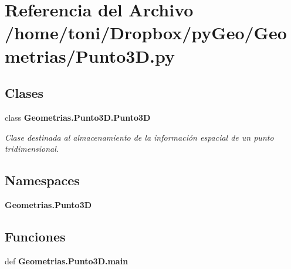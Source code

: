 \section{Referencia del Archivo /home/toni/\-Dropbox/py\-Geo/\-Geometrias/\-Punto3\-D.py}
\label{Punto3D_8py}
\subsection*{Clases}
\begin{DoxyCompactItemize}
\item 
class {\bf Geometrias.\-Punto3\-D.\-Punto3\-D}
\begin{DoxyCompactList}\small\item\em Clase destinada al almacenamiento de la información espacial de un punto tridimensional. \end{DoxyCompactList}\end{DoxyCompactItemize}
\subsection*{Namespaces}
\begin{DoxyCompactItemize}
\item 
{\bf Geometrias.\-Punto3\-D}
\end{DoxyCompactItemize}
\subsection*{Funciones}
\begin{DoxyCompactItemize}
\item 
def {\bf Geometrias.\-Punto3\-D.\-main}
\end{DoxyCompactItemize}

